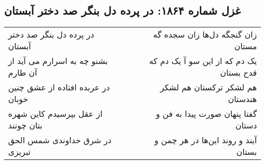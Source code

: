 \begin{center}
\section*{غزل شماره ۱۸۶۴: در پرده دل بنگر صد دختر آبستان}
\label{sec:1864}
\begin{longtable}{l p{0.5cm} r}
در پرده دل بنگر صد دختر آبستان
&&
زان گنجگه دل‌ها زان سجده گه مستان
\\
بشنو چه به اسرارم می آید از آن طارم
&&
یک دم که از این سو آ یک دم که قدح بستان
\\
در عربده افتاده از عشق چنین خوبان
&&
هم لشکر ترکستان هم لشکر هندستان
\\
از عقل بپرسیدم کاین شهره بتان چونند
&&
گفتا پنهان صورت پیدا به فن و دستان
\\
در شرق خداوندی شمس الحق تبریزی
&&
آیند و روند این‌ها در هر چمن و بستان
\\
\end{longtable}
\end{center}
